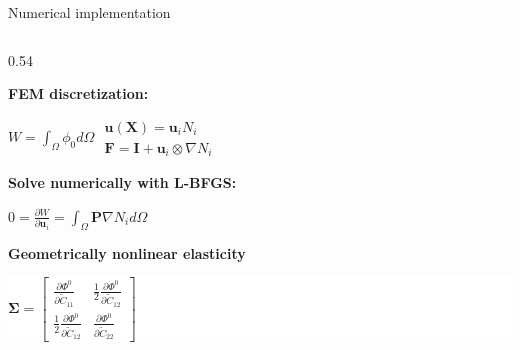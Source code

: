 \documentclass[10pt, aspectratio=169]{beamer}
\begin{document}
\begin{frame}{Numerical implementation}
\begin{columns}[c, onlytextwidth]
        \begin{column}{0.54\textwidth}
            \begin{flushleft}
                \textbf{\color{red!80!black} FEM discretization:} \\
                \vspace{0.05cm}
                \colorbox{gray!20}{
                    \begin{minipage}{\dimexpr\textwidth-12pt\relax}
                        \centering
                        \hfill $\displaystyle W = \int_{\Omega} \phi_0 d\Omega$ \hfill
                        $\displaystyle \begin{array}{l} \mathbf{u}(\mathbf{X}) = \mathbf{u}_i N_i \\ \mathbf{F} = \mathbf{I} + \mathbf{u}_i \otimes \nabla N_i \end{array}$ \hfill \null
                    \end{minipage}
                }
                
                \vspace{0.3cm}
                \textbf{\color{red!80!black} Solve numerically with L-BFGS:} \\
                \vspace{0.05cm}
                \colorbox{gray!20}{
                    \begin{minipage}{\dimexpr\textwidth-12pt\relax}
                        \centering \rule[-0.2cm]{0pt}{0.7cm}
                        $\displaystyle 0 = \frac{\partial W}{\partial \mathbf{u}_i} = \int_{\Omega} \mathbf{P} \nabla N_i d\Omega$
                    \end{minipage}
                }
                
                \vspace{0.3cm}
                \textbf{\color{red!80!black} Geometrically nonlinear elasticity} \\
                \vspace{0.05cm}
                \colorbox{gray!20}{
                    \centering
                    \colorbox{white}{
                        \rule[-0.4cm]{0pt}{1.0cm}
                        $\displaystyle \boldsymbol{\Sigma} = \left[ \begin{matrix} 
                            \frac{\partial \Phi^0}{\partial \tilde{C}_{11}} & \frac{1}{2} \frac{\partial \Phi^0}{\partial \tilde{C}_{12}} \\[0.15cm]
                            \frac{1}{2} \frac{\partial \Phi^0}{\partial \tilde{C}_{12}} & \frac{\partial \Phi^0}{\partial \tilde{C}_{22}}
                        \end{matrix} \right]$
                    }
                }
                

\end{flushleft}
\end{column}
\end{columns}
\end{frame}
\end{document}
